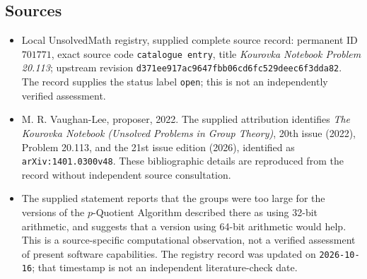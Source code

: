 \documentclass[11pt]{article}
\begin{document}
\subsection{Sources}
\begin{itemize}
\item Local UnsolvedMath registry, supplied complete source record: permanent ID \(701771\), exact source code \texttt{catalogue entry}, title \emph{Kourovka Notebook Problem 20.113}; upstream revision \texttt{d371ee917ac9647fbb06cd6fc529deec6f3dda82}. The record supplies the status label \texttt{open}; this is not an independently verified assessment.
\item M. R. Vaughan-Lee, proposer, 2022. The supplied attribution identifies \emph{The Kourovka Notebook (Unsolved Problems in Group Theory)}, 20th issue (2022), Problem 20.113, and the 21st issue edition (2026), identified as \texttt{arXiv:1401.0300v48}. These bibliographic details are reproduced from the record without independent source consultation.
\item The supplied statement reports that the groups were too large for the versions of the \(p\)-Quotient Algorithm described there as using 32-bit arithmetic, and suggests that a version using 64-bit arithmetic would help. This is a source-specific computational observation, not a verified assessment of present software capabilities. The registry record was updated on \texttt{2026-10-16}; that timestamp is not an independent literature-check date.
\end{itemize}
\end{document}
